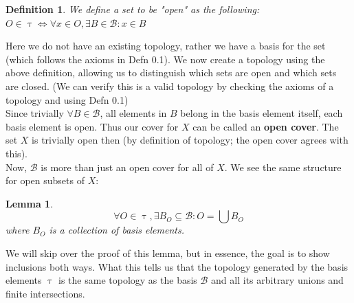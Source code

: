 \documentclass{exam}
\newtheorem{lem}{Lemma}[section]
\newtheorem{defn}{Definition}[section]
\begin{document}
\begin{defn} We define a set to be "open" as the following:
  $O \in \uptau \iff \forall x \in O, \exists B \in \mathcal{B}: x \in B$
\end{defn}
Here we do not have an existing topology, rather we have a basis for the set (which follows the axioms in Defn 0.1). We now create a topology using the above definition, allowing us to distinguish which sets are open and which sets are closed. (We can verify this is a valid topology by checking the axioms of a topology and using Defn 0.1)\\

Since trivially $\forall B \in \mathcal{B}$, all elements in $B$ belong in the basis element itself, each basis element is open. Thus our cover for $X$ can be called an \textbf{open cover}. The set $X$ is trivially open then (by definition of topology; the open cover agrees with this).\\

Now, $\mathcal{B}$ is more than just an open cover for all of $X$. We see the same structure for open subsets of $X$:
\begin{lem}
\begin{equation*}
  \forall O \in \uptau, \exists B_O \subseteq \mathcal{B}: O = \bigcup B_O
\end{equation*}
where $B_O$ is a collection of basis elements.
\end{lem}
We will skip over the proof of this lemma, but in essence, the goal is to show inclusions both ways. What this tells us that the topology generated by the basis elements $\uptau$ is the same topology as the basis $\mathcal{B}$ and all its arbitrary unions and finite intersections.
\pagebreak
\end{document}

